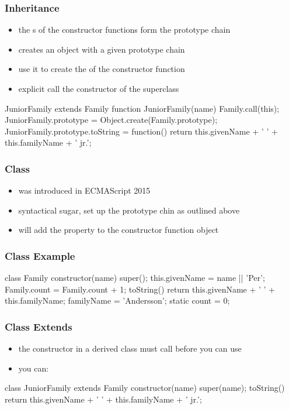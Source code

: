 \begin{frame}[fragile] \frametitle{Inheritance}
\begin{itemize}
  \item the s of the constructor functions form the prototype chain
  \item {} creates an object with a given prototype chain
  \item use it to create the  of the constructor function
  \item explicit call the constructor of the superclass
\end{itemize}
\vspace{2mm}
\begin{CodeBox}{JuniorFamily extends Family}
function JuniorFamily(name) {
  Family.call(this);
}
JuniorFamily.prototype = Object.create(Family.prototype);
JuniorFamily.prototype.toString = function() {
  return this.givenName + ' ' + 
             this.familyName + '  jr.';
}
\end{CodeBox}
\end{frame}

\begin{frame}[fragile] \frametitle{Class}
\begin{itemize}
  \item {} was introduced in ECMAScript 2015
  \item syntactical sugar, set up the prototype chin as outlined above
  \item {} will add the property to the constructor function object
\end{itemize}
\end{frame}
\begin{frame}[fragile] \frametitle{Class Example}
\begin{CodeBox}{}
class Family {
  constructor(name) {
    super();
    this.givenName = name || 'Per';
    Family.count = Family.count + 1;
  }
  toString() {
    return this.givenName + ' ' + this.familyName;
  }
  familyName = 'Andersson';
  static count = 0;
}
\end{CodeBox}
\end{frame}

\begin{frame}[fragile] \frametitle{Class Extends}
\begin{itemize}
  \item the constructor in a derived class must call  before you can use 
  \item you can: 
\end{itemize}
\begin{CodeBox}{}
class JuniorFamily extends Family {
  constructor(name) {
    super(name);
  }
 toString() {
   return this.givenName + ' ' + 
              this.familyName + '  jr.';
  }
}
\end{CodeBox}
\end{frame}

